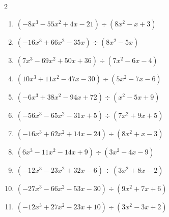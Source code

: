 \begin{multicols}{2}
\begin{enumerate}
        \phantom{$商 : 6x, \quad 剰余 : -2x+2$}

  \item $(-8x^{3}-55x^{2}+4x-21) \div (8x^{2}-x+3)$

        \phantom{$商 : -x-7, \quad 剰余 : -8x+5$}

  \item $(-16x^{3}+66x^{2}-35x) \div (8x^{2}-5x)$

        \phantom{$商 : -2x+7, \quad 剰余 : 6$}

  \item $(7x^{3}-69x^{2}+50x+36) \div (7x^{2}-6x-4)$

        \phantom{$商 : x-9, \quad 剰余 : -5x-3$}

\columnbreak %

\resetques

  \item $(10x^{3}+11x^{2}-47x-30) \div (5x^{2}-7x-6)$

        \phantom{$商 : 2x+5, \quad 剰余 : 6x-2$}

  \item $(-6x^{3}+38x^{2}-94x+72) \div (x^{2}-5x+9)$

        \phantom{$商 : -6x+8, \quad 剰余 : 7x+1$}

  \item $(-56x^{3}-65x^{2}-31x+5) \div (7x^{2}+9x+5)$

        \phantom{$商 : -8x+1, \quad 剰余 : 5x-2$}

  \item $(-16x^{3}+62x^{2}+14x-24) \div (8x^{2}+x-3)$

        \phantom{$商 : -2x+8, \quad 剰余 : 2x-6$}

  \item $(6x^{3}-11x^{2}-14x+9) \div (3x^{2}-4x-9)$

        \phantom{$商 : 2x-1, \quad 剰余 : -9x+3$}

\columnbreak %

  \item $(-12x^{3}-23x^{2}+32x-6) \div (3x^{2}+8x-2)$

        \phantom{$商 : -4x+3, \quad 剰余 : -2x-6$}

  \item $(-27x^{3}-66x^{2}-53x-30) \div (9x^{2}+7x+6)$

        \phantom{$商 : -3x-5, \quad 剰余 : 9x-2$}

  \item $(-12x^{3}+27x^{2}-23x+10) \div (3x^{2}-3x+2)$


\end{enumerate}
\end{multicols}
